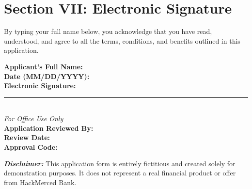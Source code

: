 \documentclass[12pt,a4paper]{article}
\begin{document}
\section*{Section VII: Electronic Signature}
By typing your full name below, you acknowledge that you have read, understood, and agree to all the terms, conditions, and benefits outlined in this application.

\bigskip
\noindent\textbf{Applicant’s Full Name:}  \\[1ex]
\noindent\textbf{Date (MM/DD/YYYY):}  \\[1ex]
\noindent\textbf{Electronic Signature:}  \\[1ex]

\vspace{2cm}
\noindent\rule{\textwidth}{0.4pt}\\
\textit{For Office Use Only}\\[1ex]
\textbf{Application Reviewed By:} \underline{\hspace{3in}}\\[2ex]
\textbf{Review Date:} \underline{\hspace{2in}}\\[2ex]
\textbf{Approval Code:} \underline{\hspace{2in}}

\bigskip

\noindent\textbf{\textit{Disclaimer:}} This application form is entirely fictitious and created solely for demonstration purposes. It does not represent a real financial product or offer from HackMerced Bank.
 
\end{document}
